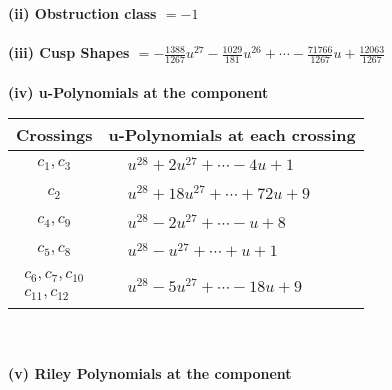 \documentclass[1p]{elsarticle_modified}
\theoremstyle{definition}
\begin{document}
\flushleft \textbf{(ii) Obstruction class $= -1$}\\~\\
\flushleft \textbf{(iii) Cusp Shapes $= -\frac{1388}{1267} u^{27}-\frac{1029}{181} u^{26}+\cdots-\frac{71766}{1267} u+\frac{12063}{1267}$}\\~\\
\newpage\renewcommand{\arraystretch}{1}
\flushleft \textbf{(iv) u-Polynomials at the component}\newline \\
\begin{tabular}{m{50pt}|m{274pt}}
Crossings & \hspace{64pt}u-Polynomials at each crossing \\
\hline $$\begin{aligned}c_{1},c_{3}\end{aligned}$$&$\begin{aligned}
&u^{28}+2 u^{27}+\cdots-4 u+1
\end{aligned}$\\
\hline $$\begin{aligned}c_{2}\end{aligned}$$&$\begin{aligned}
&u^{28}+18 u^{27}+\cdots+72 u+9
\end{aligned}$\\
\hline $$\begin{aligned}c_{4},c_{9}\end{aligned}$$&$\begin{aligned}
&u^{28}-2 u^{27}+\cdots- u+8
\end{aligned}$\\
\hline $$\begin{aligned}c_{5},c_{8}\end{aligned}$$&$\begin{aligned}
&u^{28}- u^{27}+\cdots+u+1
\end{aligned}$\\
\hline $$\begin{aligned}c_{6},c_{7},c_{10}\\c_{11},c_{12}\end{aligned}$$&$\begin{aligned}
&u^{28}-5 u^{27}+\cdots-18 u+9
\end{aligned}$\\
\hline
\end{tabular}\\~\\
\newpage\renewcommand{\arraystretch}{1}
\flushleft \textbf{(v) Riley Polynomials at the component}\newline \\
\end{document}
